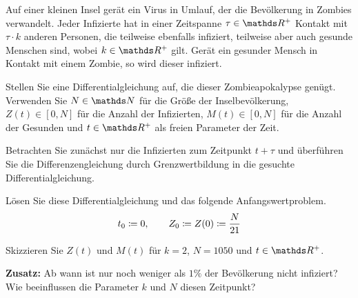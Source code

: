 \begin{atiTask}[
	title = Eine Zombieapokalypse,
	language = Deutsch
]
	Auf einer kleinen Insel gerät ein Virus in Umlauf, der die Bevölkerung in Zombies verwandelt.
	Jeder Infizierte hat in einer Zeitspanne $\tau\in\setR^+$ Kontakt mit $\tau\cdot k$ anderen Personen, die teilweise ebenfalls infiziert, teilweise aber auch gesunde Menschen sind, wobei $k\in\setR^+$ gilt.
	Gerät ein gesunder Mensch in Kontakt mit einem Zombie, so wird dieser infiziert.
	\medskip
	\begin{atiSubtasks}
		\item{
			Stellen Sie eine Differentialgleichung auf, die dieser Zombieapokalypse genügt.
			Verwenden Sie $N\in\setN$ für die Größe der Inselbevölkerung, $Z(t)\in[0,N]$ für die Anzahl der Infizierten, $M(t)\in[0,N]$ für die Anzahl der Gesunden und $t\in\setR^+$ als freien Parameter der Zeit.

			\begin{atiNote}
				Betrachten Sie zunächst nur die Infizierten zum Zeitpunkt $t+\tau$ und überführen Sie die Differenzengleichung durch Grenzwertbildung in die gesuchte Differentialgleichung.
			\end{atiNote}
		}
		\item{
			Lösen Sie diese Differentialgleichung und das folgende Anfangswertproblem.
			\[
				t_0\coloneqq 0,\qquad Z_0\coloneqq Z(0) \coloneqq \frac{N}{21}
			\]
		}
		\item{
			Skizzieren Sie $Z(t)$ und $M(t)$ für $k=2$, $N=1050$ und $t\in\setR^+$.
		}
		\item{
			\textbf{Zusatz:} Ab wann ist nur noch weniger als $1\unit{\%}$ der Bevölkerung nicht infiziert?
			Wie beeinflussen die Parameter $k$ und $N$ diesen Zeitpunkt?
		}
	\end{atiSubtasks}
\end{atiTask}
